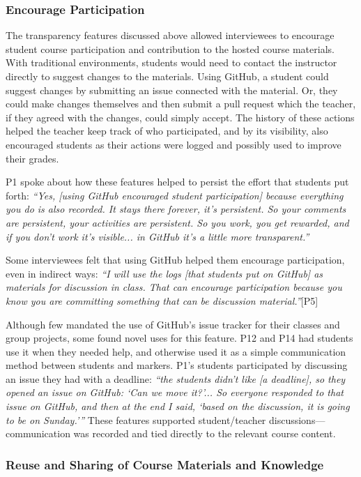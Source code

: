 \subsubsection{Encourage Participation}
The transparency features discussed above allowed interviewees to encourage student course participation and contribution to the hosted course materials. With traditional environments, students would need to contact the instructor directly to suggest changes to the materials. Using GitHub, a student could suggest changes by submitting an issue connected with the material. Or, they could make changes themselves and then submit a pull request which the teacher, if they agreed with the changes, could simply accept. The history of these actions helped the teacher keep track of who participated, and by its visibility, also encouraged students as their actions were logged and possibly used to improve their grades.

P1 spoke about how these features helped to persist the effort that students put forth:
\textit{``Yes, [using GitHub encouraged student participation] because everything you do is also recorded. It stays there forever, it's persistent. So your comments are persistent, your activities are persistent. So you work, you get rewarded, and if you don't work it's visible... in GitHub it's a little more transparent.''}

Some interviewees felt that using GitHub helped them encourage participation, even in indirect ways: \textit{``I will use the logs [that students put on GitHub] as materials for discussion in class. That can encourage participation because you know you are committing something that can be discussion material.''}[P5]

Although few mandated the use of GitHub's issue tracker for their classes and group projects, some found novel uses for this feature. P12 and P14 had students use it when they needed help, and otherwise used it as a simple communication method between students and markers. P1's students participated by discussing an issue they had with a deadline: \textit{``the students didn't like [a deadline], so they opened an issue on GitHub: `Can we move it?'... So everyone responded to that issue on GitHub, and then at the end I said, `based on the discussion, it is going to be on Sunday.'''} These features supported student/teacher discussions---communication was recorded and tied directly to the relevant course content.

\subsubsection{Reuse and Sharing of Course Materials and Knowledge}

